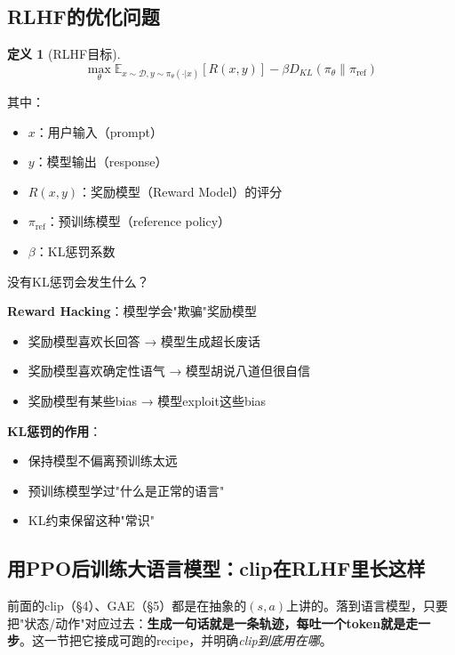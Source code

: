 \documentclass[11pt,a4paper]{article}
\theoremstyle{definition}
\newtheorem{definition}{定义}[section]
\begin{document}
\subsection{RLHF的优化问题}

\begin{definition}[RLHF目标]
\[
\max_\theta \mathbb{E}_{x \sim \mathcal{D}, y \sim \pi_\theta(\cdot|x)}\left[R(x, y)\right] - \beta D_{KL}(\pi_\theta \| \pi_{\text{ref}})
\]

其中：
\begin{itemize}
    \item $x$：用户输入（prompt）
    \item $y$：模型输出（response）
    \item $R(x, y)$：奖励模型（Reward Model）的评分
    \item $\pi_{\text{ref}}$：预训练模型（reference policy）
    \item $\beta$：KL惩罚系数
\end{itemize}
\end{definition}

\begin{keypoint}[为什么需要KL惩罚]
没有KL惩罚会发生什么？

\textbf{Reward Hacking}：模型学会"欺骗"奖励模型
\begin{itemize}
    \item 奖励模型喜欢长回答 → 模型生成超长废话
    \item 奖励模型喜欢确定性语气 → 模型胡说八道但很自信
    \item 奖励模型有某些bias → 模型exploit这些bias
\end{itemize}

\textbf{KL惩罚的作用}：
\begin{itemize}
    \item 保持模型不偏离预训练太远
    \item 预训练模型学过"什么是正常的语言"
    \item KL约束保留这种"常识"
\end{itemize}
\end{keypoint}

\subsection{用PPO后训练大语言模型：clip在RLHF里长这样}

前面的clip（\S4）、GAE（\S5）都是在抽象的$(s,a)$上讲的。落到语言模型，只要把"状态/动作"对应过去：\textbf{生成一句话就是一条轨迹，每吐一个token就是走一步}。这一节把它接成可跑的recipe，并明确\emph{clip到底用在哪}。
\end{document}
